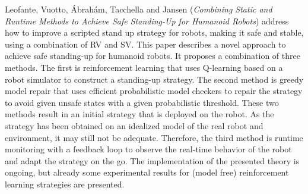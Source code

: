 

Leofante, Vuotto, \'{A}brah\'{a}m, Tacchella and Jansen
\cite{isola-2016-leofante}
({\em Combining Static and Runtime Methods to Achieve 
      Safe Standing-Up for Humanoid Robots})
address how to improve a scripted stand up strategy for robots, making
it safe and stable, using a combination of RV and SV. 
This paper describes a novel approach to achieve safe standing-up for humanoid robots. It proposes a combination of three methods. The first is reinforcement learning that uses Q-learning based on a robot simulator to construct a standing-up strategy. The second method is greedy model repair that uses efficient probabilistic model checkers to repair the strategy to avoid given unsafe states with a given probabilistic threshold. These two methods result in an initial strategy that is deployed on the robot. As the strategy has been obtained on an idealized model of the real robot and environment, it may still not be adequate. Therefore, the third method is runtime monitoring with a feedback loop to observe the real-time behavior of the robot and adapt the strategy on the go. 
The implementation of the presented theory is
ongoing, but already some experimental results for (model free)
reinforcement learning strategies are presented.

